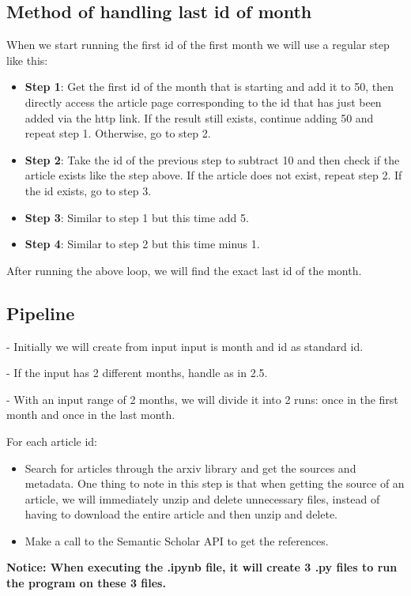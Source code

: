 \documentclass[12pt]{article}
\begin{document}
\subsection{Method of handling last id of month}
When we start running the first id of the first month we will use a regular step like this: 
\begin{itemize}
    \item \textbf{Step 1}: Get the first id of the month that is starting and add it to 50, then directly access the article page corresponding to the id that has just been added via the http link. If the result still exists, continue adding 50 and repeat step 1. Otherwise, go to step 2.
    \item \textbf{Step 2}: Take the id of the previous step to subtract 10 and then check if the article exists like the step above. If the article does not exist, repeat step 2. If the id exists, go to step 3.
    \item \textbf{Step 3}: Similar to step 1 but this time add 5.
    \item \textbf{Step 4}: Similar to step 2 but this time minus 1.
\end{itemize}
After running the above loop, we will find the exact last id of the month.

\subsection{Pipeline}

- Initially we will create from input input is month and id as standard id.

- If the input has 2 different months, handle as in 2.5.

- With an input range of 2 months, we will divide it into 2 runs: once in the first month and once in the last month.

For each article id:
\begin{itemize}
    \item Search for articles through the arxiv library and get the sources and metadata. One thing to note in this step is that when getting the source of an article, we will immediately unzip and delete unnecessary files, instead of having to download the entire article and then unzip and delete.
    \item Make a call to the Semantic Scholar API to get the references.
\end{itemize}


\textbf{Notice: When executing the .ipynb file, it will create 3 .py files to run the program on these 3 files.} 
\end{document}
